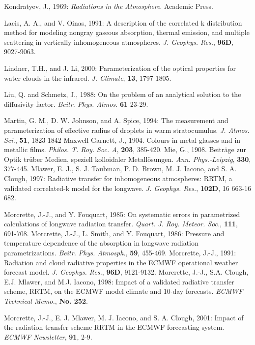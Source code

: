 \decrefname
Kondratyev, J., 1969:
      {\it Radiations in the Atmosphere}.
      Academic Press.

\decrefname
Lacis, A. A., and V. Oinas, 1991: A description of the correlated k distribution method for modeling nongray gaseous absorption, thermal emission, and multiple scattering in vertically inhomogeneous atmospheres.
 {\it J. Geophys. Res.},
 {\bf 96D},
 9027-9063.

\decrefname
Lindner, T.H., and J. Li, 2000: Parameterization of the optical properties for water clouds in the infrared.
{\it J. Climate},
{\bf 13},
1797-1805.

\decrefname
Liu, Q. and Schmetz, J., 1988: On the problem of an analytical solution to the diffusivity factor.
 {\it Beitr. Phys. Atmos. }
 {\bf 61 }
 23-29.

\decrefname
Martin, G. M., D. W. Johnson, and A. Spice, 1994: The measurement and
parameterization of effective radius of droplets in warm
stratocumulus. 
{\it J. Atmos. Sci.},
{\bf 51}, 1823-1842
\decrefname
Maxwell-Garnett, J., 1904. Colours in metal glasses and in metallic films.
{\it Philos. T. Roy. Soc. A}, {\bf 203}, 385-420.
\decrefname
Mie, G., 1908. Beitr\"age zur Optik tr\"uber Medien, speziell kolloidaler Metall\"osungen.
{\it Ann. Phys.-Leipzig}, {\bf 330}, 377-445.
\decrefname
Mlawer, E. J., S. J. Taubman, P. D. Brown, M. J. Iacono, and S. A. Clough, 1997:
Radiative transfer for inhomogeneous atmospheres: RRTM, a validated correlated-k model for the longwave. 
{\it J. Geophys. Res.},
{\bf 102D},
16 663-16 682.

\decrefname
Morcrette, J.-J., and Y. Fouquart, 1985:
      On systematic errors in parametrized calculations of longwave radiation
      transfer.
      {\it Quart. J. Roy. Meteor. Soc.},
      {\bf 111},
      691-708.
\decrefname
Morcrette, J.-J., L. Smith, and Y. Fouquart, 1986:
      Pressure and temperature dependence of the absorption in longwave
      radiation parametrizations.
      {\it Beitr. Phys. Atmosph.},
      {\bf 59},
      455-469.
\decrefname
Morcrette, J.-J., 1991: Radiation and cloud radiative properties in the ECMWF operational weather forecast model.
 {\it J. Geophys. Res.},
 {\bf 96D},
 9121-9132.
\decrefname
Morcrette, J.-J., S.A. Clough, E.J. Mlawer, and M.J. Iacono, 1998: Impact of
a validated radiative transfer scheme, RRTM, on the ECMWF model climate and
10-day forecasts.
{\it  ECMWF Technical Memo.},
{\bf  No. 252}.

\decrefname
Morcrette, J.-J., E. J. Mlawer, M. J. Iacono, and S. A. Clough, 2001: Impact
of the radiation transfer scheme RRTM in the ECMWF forecasting system.
{\it ECMWF Newsletter},
{\bf 91},
 2-9.

